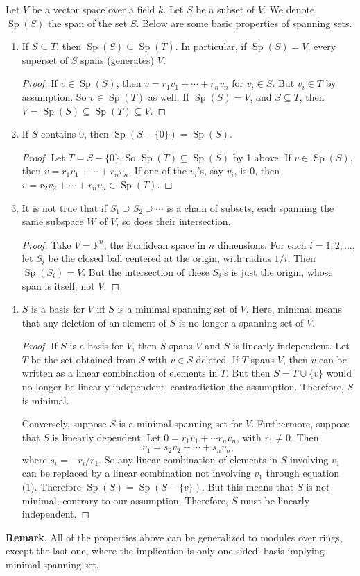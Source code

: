 \documentclass[12pt]{article}
\def\Sp{\operatorname{Sp}}
\begin{document}
Let $V$ be a vector space over a field $k$.  Let $S$ be a subset of $V$.  We denote $\Sp(S)$ the span of the set $S$.  Below are some basic properties of spanning sets.

\begin{enumerate}
\item If $S\subseteq T$, then $\Sp(S)\subseteq \Sp(T)$.  In particular, if $\Sp(S)=V$, every superset of $S$ spans (generates) $V$.
\begin{proof} If $v \in \Sp(S)$, then $v=r_1v_1+\cdots +r_nv_n$ for $v_i\in S$.  But $v_i\in T$ by assumption.  So $v\in \Sp(T)$ as well.  If $\Sp(S)=V$, and $S\subseteq T$, then $V=\Sp(S)\subseteq \Sp(T) \subseteq V$.  \end{proof}
\item If $S$ contains $0$, then $\Sp(S-\lbrace 0\rbrace)=\Sp(S)$.
\begin{proof} Let $T=S-\lbrace 0\rbrace$.  So $\Sp(T)\subseteq \Sp(S)$ by 1 above.  If $v\in \Sp(S)$, then $v=r_1v_1+\cdots + r_nv_n$.  If one of the $v_i$'s, say $v_i$, is $0$, then $v=r_2v_2+\cdots +r_nv_n\in \Sp(T)$.  \end{proof}
\item It is not true that if $S_1\supseteq S_2\supseteq \cdots$ is a chain of subsets, each spanning the same subspace $W$ of $V$, so does their intersection.
\begin{proof}  Take $V=\mathbb{R}^n$, the Euclidean space in $n$ dimensions.  For each $i=1,2,\ldots$, let $S_i$ be the closed ball centered at the origin, with radius $1/i$.  Then $\Sp(S_i)=V$.  But the intersection of these $S_i$'s is just the origin, whose span is itself, not $V$.
\end{proof}
\item $S$ is a basis for $V$ iff $S$ is a minimal spanning set of $V$.  Here, minimal means that any deletion of an element of $S$ is no longer a spanning set of $V$.
\begin{proof}  If $S$ is a basis for $V$, then $S$ spans $V$ and $S$ is linearly independent.  Let $T$ be the set obtained from $S$ with $v\in S$ deleted.  If $T$ spans $V$, then $v$ can be written as a linear combination of elements in $T$.  But then $S=T\cup \lbrace v\rbrace$ would no longer be linearly independent, contradiction the assumption.  Therefore, $S$ is minimal.

Conversely, suppose $S$ is a minimal spanning set for $V$.  Furthermore, suppose that $S$ is linearly dependent.  Let $0=r_1v_1+\cdots r_nv_n$, with $r_1\ne 0$.  Then 
\begin{equation}
v_1=s_2v_2+\cdots +s_nv_n,
\end{equation} 
where $s_i=-r_i/r_1$.  So any linear combination of elements in $S$ involving $v_1$ can be replaced by a linear combination not involving $v_1$ through equation (1).  Therefore $\Sp(S)=\Sp(S-\lbrace v\rbrace)$.  But this means that $S$ is not minimal, contrary to our assumption.  Therefore, $S$ must be linearly independent.
\end{proof}
\end{enumerate}

\textbf{Remark}.  All of the properties above can be generalized to modules over rings, except the last one, where the implication is only one-sided: basis implying minimal spanning set.
\end{document}

